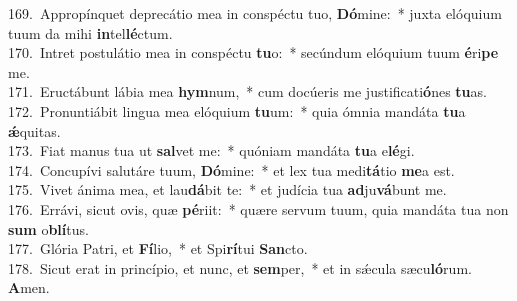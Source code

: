 {169.~}Appropínquet deprecátio mea in conspéctu tuo, \textbf{Dó}mine:~* juxta elóquium tuum da mihi \textbf{in}tel\textbf{lé}ctum.\\
{170.~}Intret postulátio mea in conspéctu \textbf{tu}o:~* secúndum elóquium tuum \textbf{é}ri\textbf{pe} me.\\
{171.~}Eructábunt lábia mea \textbf{hym}num,~* cum docúeris me justificati\textbf{ó}nes \textbf{tu}as.\\
{172.~}Pronuntiábit lingua mea elóquium \textbf{tu}um:~* quia ómnia mandáta \textbf{tu}a \textbf{ǽ}quitas.\\
{173.~}Fiat manus tua ut \textbf{sal}vet me:~* quóniam mandáta \textbf{tu}a e\textbf{lé}gi.\\
{174.~}Concupívi salutáre tuum, \textbf{Dó}mine:~* et lex tua medi\textbf{tá}tio \textbf{me}a est.\\
{175.~}Vivet ánima mea, et lau\textbf{dá}bit te:~* et judícia tua \textbf{ad}ju\textbf{vá}bunt me.\\
{176.~}Errávi, sicut ovis, quæ \textbf{pé}riit:~* quære servum tuum, quia mandáta tua non \textbf{sum} o\textbf{blí}tus.\\
{177.~}Glória Patri, et \textbf{Fí}lio,~* et Spi\textbf{rí}tui \textbf{San}cto.\\
{178.~}Sicut erat in princípio, et nunc, et \textbf{sem}per,~* et in sǽcula sæcu\textbf{ló}rum. \textbf{A}men.\\
